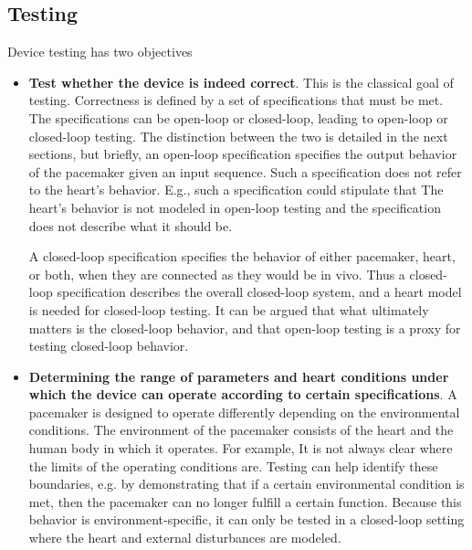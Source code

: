 \subsection{Testing}
\label{testingObjectives}
Device testing has two objectives

\begin{itemize}
	\item \textbf{Test whether the device is indeed correct}.
	This is the classical goal of testing.
	Correctness is defined by a set of specifications that must be met.	
	The specifications can be open-loop or closed-loop, leading to open-loop or closed-loop testing.
	The distinction between the two is detailed in the next sections, but briefly, an open-loop specification specifies the output behavior of the pacemaker given an input sequence.
	Such a specification does not refer to the heart's behavior.
	E.g., such a specification could stipulate that 
	The heart's behavior is not modeled in open-loop testing and the specification does not describe what it should be.
	
	A closed-loop specification specifies the behavior of either pacemaker, heart, or both, when they are connected as they would be in vivo.
	Thus a closed-loop specification describes the overall closed-loop system, and a heart model is needed for closed-loop testing.
	It can be argued that what ultimately matters is the closed-loop behavior, and that open-loop testing is a proxy for testing closed-loop behavior.
	\item \textbf{Determining the range of parameters and heart conditions under which the device can operate according to certain specifications}.
	A pacemaker is designed to operate differently depending on the environmental conditions. 
	The environment of the pacemaker consists of the heart and the human body in which it operates. 
	For example, 
	It is not always clear where the limits of the operating conditions are.
	Testing can help identify these boundaries, e.g. by demonstrating that if a certain environmental condition is met, then the pacemaker can no longer fulfill a certain function.
	Because this behavior is environment-specific, it can only be tested in a closed-loop setting where the heart and external disturbances are modeled.
\end{itemize}